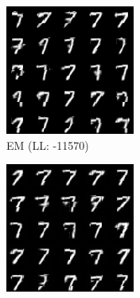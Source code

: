 \begin{figure}[H]
\begin{subfigure}[b]{0.24\textwidth}
        \includegraphics[width=\textwidth]{figures/einsum/7mnist_EM.png}
        \caption{EM (LL: -11570)}
    \end{subfigure}
    \begin{subfigure}[b]{0.24\textwidth}
        \centering
        \includegraphics[width=\textwidth]{figures/einsum/7mnist_SGD.png} 

\end{subfigure}
\end{figure}
